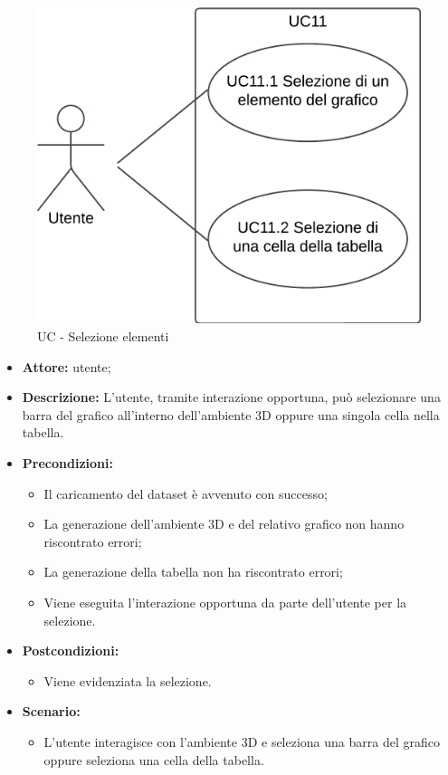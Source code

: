 \begin{figure}[h!]\centering
    \includegraphics[scale=0.7]{template/images/UC11.png}
    \caption{UC - Selezione elementi}
\end{figure}
\begin{itemize}    
    \item \textbf{Attore:} utente;
    \item \textbf{Descrizione:} L'utente, tramite interazione opportuna, può selezionare una barra del grafico all'interno dell'ambiente 3D oppure una singola cella nella tabella.
    \item \textbf{Precondizioni:}    
        \begin{itemize}
            \item Il caricamento del dataset è avvenuto con successo;
            \item La generazione dell'ambiente 3D e del relativo grafico non hanno riscontrato errori;
            \item La generazione della tabella non ha riscontrato errori;
            \item Viene eseguita l'interazione opportuna da parte dell'utente per la selezione.
        \end{itemize}    
    \item \textbf{Postcondizioni:}
        \begin{itemize}
            \item Viene evidenziata la selezione.
        \end{itemize}    
    \item \textbf{Scenario:} 
        \begin{itemize}
            \item L'utente interagisce con l'ambiente 3D e seleziona una barra del grafico oppure seleziona una cella della tabella.
        \end{itemize}
\end{itemize}

